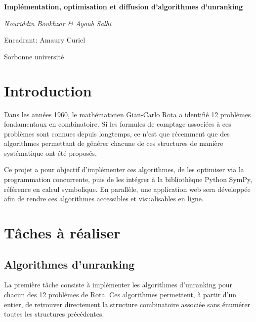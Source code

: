 \documentclass[12pt, a4paper]{report}
\begin{document}
\begin{titlepage}
  \centering
  \vspace*{3cm}

  {\Huge\bfseries  Impl\'ementation, optimisation et diffusion d’algorithmes d’unranking\par}
  \vspace{3cm}

  {\Large\itshape Nouriddin Boukhzar \& Ayoub Salhi\par}
  {\large Encadrant: Amaury Curiel\par}
  \vspace{1cm}
  {\normalsize Sorbonne universit\'e\par}
\end{titlepage}

\tableofcontents
\clearpage

\chapter{Introduction}

Dans les ann\'ees 1960, le math\'ematicien Gian-Carlo Rota a identifi\'e 12
probl\`emes fondamentaux en combinatoire. Si les formules de comptage associ\'ees
\`a ces probl\`emes sont connues depuis longtemps, ce n'est que r\'ecemment que
des algorithmes permettant de g\'en\'erer chacune de ces structures de mani\`ere
syst\'ematique ont \'et\'e propos\'es.

Ce projet a pour objectif d'impl\'ementer ces algorithmes, de les optimiser via la
programmation concurrente, puis de les int\'egrer \`a la biblioth\`eque Python
SymPy, r\'ef\'erence en calcul symbolique. En parall\`ele, une application web
sera d\'evelopp\'ee afin de rendre ces algorithmes accessibles et visualisables
en ligne.

\chapter{T\^aches \`a r\'ealiser}

\section{Algorithmes d'unranking}

La premi\`ere t\^ache consiste \`a impl\'ementer les algorithmes d'unranking
pour chacun des 12 probl\`emes de Rota. Ces algorithmes permettent, \`a partir
d'un entier, de retrouver directement la structure combinatoire associ\'ee sans
\'enum\'erer toutes les structures pr\'ec\'edentes.
\end{document}
